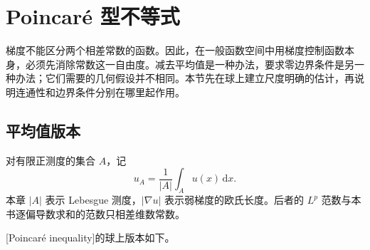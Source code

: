 \section{Poincaré 型不等式}
\label{b1:sec:2401}

梯度不能区分两个相差常数的函数。因此，在一般函数空间中用梯度控制函数本身，必须先消除常数这一自由度。减去平均值是一种办法，要求零边界条件是另一种办法；它们需要的几何假设并不相同。本节先在球上建立尺度明确的估计，再说明连通性和边界条件分别在哪里起作用。

\subsection{平均值版本}
\label{b1:subsec:240101}

对有限正测度的集合 \(A\)，记
\[
 u_A=\frac1{|A|}\int_Au(x)\,\mathrm dx.
\]
本章 \(|A|\) 表示 Lebesgue 测度，\(|\nabla u|\) 表示弱梯度的欧氏长度。后者的 \(L^p\) 范数与本书逐偏导数求和的范数只相差维数常数。

\ProseParagraphBreak

[Poincaré inequality]的球上版本如下。

